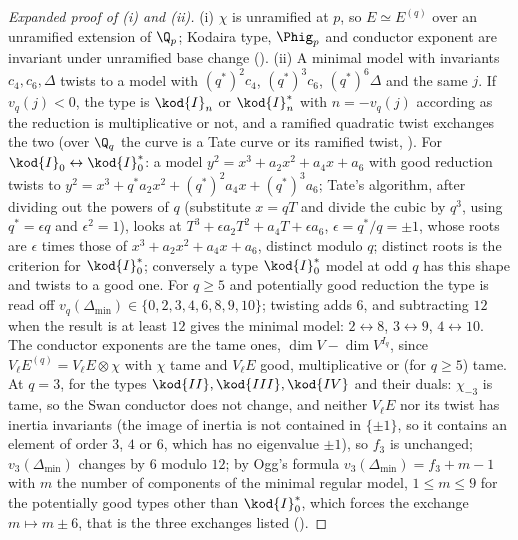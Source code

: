 \begin{sloppypar}
\begin{proof}[Expanded proof of (i) and (ii)]
(i) $\chi$ is unramified at $p$, so $E\simeq E^{(q)}$ over an unramified extension of $\Q_p$; Kodaira type, $\Phig_p$ and conductor exponent are invariant under unramified base
change (). (ii) A minimal model with invariants $c_4,c_6,\Delta$ twists to a model with $(q^*)^2c_4$, $(q^*)^3c_6$, $(q^*)^6\Delta$ and the same $j$. If $v_q(j)<0$, the
type is $\kod{I}_n$ or $\kod{I}_n^*$ with $n=-v_q(j)$ according as the reduction is multiplicative or not, and a ramified quadratic twist exchanges the two (over $\Q_q$ the curve is a
Tate curve or its ramified twist, ). For $\kod{I}_0\leftrightarrow\kod{I}_0^*$: a model $y^2=x^3+a_2x^2+a_4x+a_6$ with good reduction twists to
$y^2=x^3+q^*a_2x^2+(q^*)^2a_4x+(q^*)^3a_6$; Tate's algorithm, after dividing out the powers of $q$ (substitute $x=qT$ and divide the cubic by $q^3$, using $q^*=\epsilon q$ and $\epsilon^2=1$), looks at $T^3+\epsilon a_2T^2+a_4T+\epsilon a_6$, $\epsilon=q^*/q=\pm1$, whose roots are $\epsilon$
times those of $x^3+a_2x^2+a_4x+a_6$, distinct modulo $q$; distinct roots is the criterion for $\kod{I}_0^*$; conversely a type $\kod{I}_0^*$ model at odd $q$ has this shape and
twists to a good one. For $q\ge5$ and potentially good reduction the type is read off $v_q(\Delta_{\min})\in\{0,2,3,4,6,8,9,10\}$; twisting adds $6$, and subtracting $12$ when the
result is at least $12$ gives the minimal model: $2\leftrightarrow8$, $3\leftrightarrow9$, $4\leftrightarrow10$. The conductor exponents are the tame ones, $\dim V-\dim V^{I_q}$, since $V_\ell E^{(q)}=V_\ell E\otimes\chi$ with $\chi$
tame and $V_\ell E$ good, multiplicative or (for $q\ge5$) tame. At $q=3$, for the types $\kod{II},\kod{III},\kod{IV}$ and their duals: $\chi_{-3}$ is tame, so the Swan conductor does not change, and neither $V_\ell E$ nor its twist has inertia invariants (the
image of inertia is not contained in $\{\pm1\}$, so it contains an element of order $3$, $4$ or $6$, which has no eigenvalue $\pm1$), so $f_3$ is unchanged; $v_3(\Delta_{\min})$ changes
by $6$ modulo $12$; by Ogg's formula $v_3(\Delta_{\min})=f_3+m-1$ with $m$ the number of components of the minimal regular model, $1\le m\le9$ for the potentially good types
other than $\kod{I}_0^*$, which forces the exchange $m\mapsto m\pm6$, that is the three exchanges listed ().
\end{proof}


\end{sloppypar}

